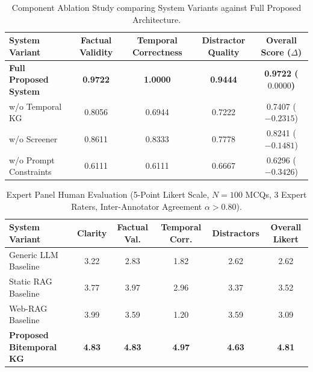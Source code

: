 \begin{table}[h]
\centering
\caption{Component Ablation Study comparing System Variants against Full Proposed Architecture.}
\label{tab:ablation_results}
\begin{tabular}{lcccc}
\hline
\textbf{System Variant} & \textbf{Factual Validity} & \textbf{Temporal Correctness} & \textbf{Distractor Quality} & \textbf{Overall Score ($\Delta$)} \\
\hline
\textbf{Full Proposed System} & \textbf{0.9722} & \textbf{1.0000} & \textbf{0.9444} & \textbf{0.9722 ($0.0000$)} \\
w/o Temporal KG & 0.8056 & 0.6944 & 0.7222 & 0.7407 ($-0.2315$) \\
w/o Screener & 0.8611 & 0.8333 & 0.7778 & 0.8241 ($-0.1481$) \\
w/o Prompt Constraints & 0.6111 & 0.6111 & 0.6667 & 0.6296 ($-0.3426$) \\
\hline
\end{tabular}
\end{table}


\begin{table}[h]
\centering
\caption{Expert Panel Human Evaluation (5-Point Likert Scale, $N=100$ MCQs, 3 Expert Raters, Inter-Annotator Agreement $\alpha > 0.80$).}
\label{tab:human_evaluation}
\begin{tabular}{lccccc}
\hline
\textbf{System Variant} & \textbf{Clarity} & \textbf{Factual Val.} & \textbf{Temporal Corr.} & \textbf{Distractors} & \textbf{Overall Likert} \\
\hline
Generic LLM Baseline & 3.22 & 2.83 & 1.82 & 2.62 & 2.62 \\
Static RAG Baseline  & 3.77 & 3.97 & 2.96 & 3.37 & 3.52 \\
Web-RAG Baseline     & 3.99 & 3.59 & 1.20 & 3.59 & 3.09 \\
\textbf{Proposed Bitemporal KG} & \textbf{4.83} & \textbf{4.83} & \textbf{4.97} & \textbf{4.63} & \textbf{4.81} \\
\hline
\end{tabular}
\end{table}
